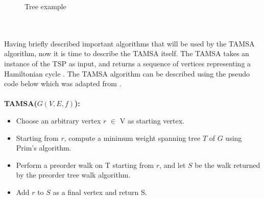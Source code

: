 \documentclass[12pt]{article}
\numberwithin{equation}{subsection}
\numberwithin{table}{subsection}
\numberwithin{algorithm}{subsection}
\begin{document}
\begin{figure}[h]
\centering
{}
\caption{Tree example}
\label{tree_example}
\end{figure}\\\\
Having briefly described important algorithms that will be used by the TAMSA algorithm, now it is time to describe the TAMSA itself. The TAMSA takes an instance of the TSP as input, and returns a sequence of vertices representing a Hamiltonian cycle \cite{cormen_leiserson_rivest_stein}. The TAMSA algorithm can be described using the pseudo code below which was adapted from \cite{cormen_leiserson_rivest_stein}.\\\\
\textbf{TAMSA($G(V,E,f)$):}
\begin{itemize}
\itemsep0em
\item Choose an arbitrary vertex $r$ $\in$ V as starting vertex.
\item Starting from $r$, compute a minimum weight spanning tree $T$ of $G$ using Prim's algorithm.
\item Perform a preorder walk on T starting from $r$, and let $S$ be the walk returned by the preorder tree walk algorithm.
\item Add $r$ to $S$ as a final vertex and return S.
\end{itemize}
\end{document}
